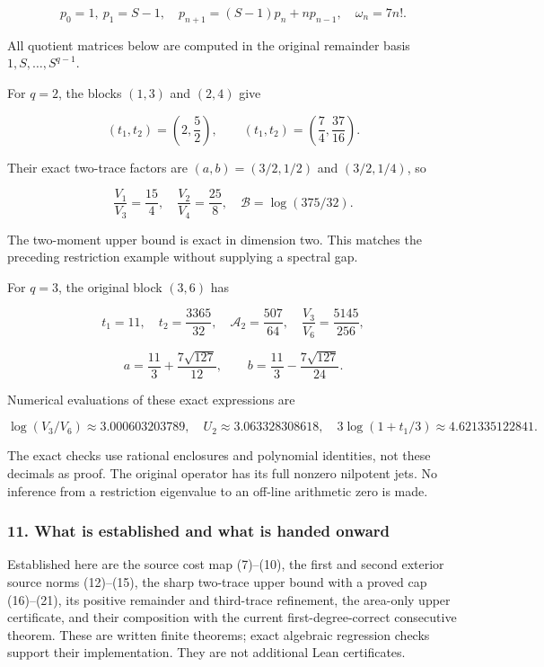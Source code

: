 \[
 p_0=1,\ p_1=S-1,\quad p_{n+1}=(S-1)p_n+np_{n-1},\quad
 \omega_n=7n!.
\]

All quotient matrices below are computed in the original remainder basis \(1,S,\ldots,S^{q-1}\).

For \(q=2\), the blocks \((1,3)\) and \((2,4)\) give

\[
 (t_1,t_2)=\left(2,\frac52\right),\qquad
 (t_1,t_2)=\left(\frac74,\frac{37}{16}\right).
\]

Their exact two-trace factors are \((a,b)=(3/2,1/2)\) and \((3/2,1/4)\), so

\[
 \frac{V_1}{V_3}=\frac{15}{4},\quad
 \frac{V_2}{V_4}=\frac{25}{8},\quad
 \mathcal B=\log(375/32).
\]

The two-moment upper bound is exact in dimension two. This matches the preceding restriction example without supplying a spectral gap.

For \(q=3\), the original block \((3,6)\) has

\[
 t_1=11,\quad t_2=\frac{3365}{32},\quad
 \mathcal A_2=\frac{507}{64},\quad \frac{V_3}{V_6}=\frac{5145}{256},
\]

\[
 a=\frac{11}{3}+\frac{7\sqrt{127}}{12},\qquad
 b=\frac{11}{3}-\frac{7\sqrt{127}}{24}.
\]

Numerical evaluations of these exact expressions are

\[
 \log(V_3/V_6)\approx3.000603203789,\quad
 U_2\approx3.063328308618,\quad
 3\log(1+t_1/3)\approx4.621335122841.
\]

The exact checks use rational enclosures and polynomial identities, not these decimals as proof. The original operator has its full nonzero nilpotent jets. No inference from a restriction eigenvalue to an off-line arithmetic zero is made.

\subsubsection{11. What is established and what is handed onward}\label{endpoint-relation_moment_original--what-is-established-and-what-is-handed-onward}

Established here are the source cost map (7)--(10), the first and second exterior source norms (12)--(15), the sharp two-trace upper bound with a proved cap (16)--(21), its positive remainder and third-trace refinement, the area-only upper certificate, and their composition with the current first-degree-correct consecutive theorem. These are written finite theorems; exact algebraic regression checks support their implementation. They are not additional Lean certificates.

